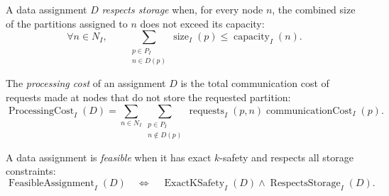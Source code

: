 \begin{definition}\label{def:respects-storage}
A data assignment $D$ \emph{respects storage} when, for every node $n$, the
combined size of the partitions assigned to $n$ does not exceed its capacity:
\[
  \forall n\in N_I, \qquad
  \sum_{\substack{p\in P_I\\ n\in D(p)}}
    \operatorname{size}_I(p)
  \leq \operatorname{capacity}_I(n).
\]
\end{definition}

\begin{definition}\label{def:processing-cost}
The \emph{processing cost} of an assignment $D$ is the total communication cost
of requests made at nodes that do not store the requested partition:
\[
  \operatorname{ProcessingCost}_I(D)
  = \sum_{n\in N_I}\sum_{\substack{p\in P_I\\ n\notin D(p)}}
      \operatorname{requests}_I(p,n)
      \operatorname{communicationCost}_I(p).
\]
\end{definition}

\begin{definition}\label{def:feasible-assignment}
A data assignment is \emph{feasible} when it has exact $k$-safety and respects
all storage constraints:
\[
  \operatorname{FeasibleAssignment}_I(D)
  \quad\Longleftrightarrow\quad
  \operatorname{ExactKSafety}_I(D)
  \wedge \operatorname{RespectsStorage}_I(D).
\]
\end{definition}


